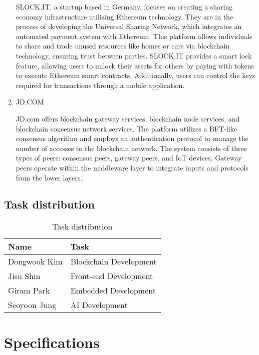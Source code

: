 \documentclass[conference]{IEEEtran}
\begin{document}
\begin{enumerate}[itemsep=2ex, parsep=1ex]
	      SLOCK.IT, a startup based in Germany, focuses on creating a sharing
	      economy infrastructure utilizing Ethereum technology. They are in the process
	      of developing the Universal Sharing Network, which integrates an automated
	      payment system with Ethereum. This platform allows individuals to share and
	      trade unused resources like homes or cars via blockchain technology,
	      ensuring trust between parties. SLOCK.IT provides a smart lock feature,
	      allowing users to unlock their assets for others by paying with tokens to
	      execute Ethereum smart contracts. Additionally, users can control the keys
	      required for transactions through a mobile application.
	      	      	      
	\item JD.COM
	      	      	      
	      JD.com offers blockchain gateway services, blockchain node services, and
	      blockchain consensus network services. The platform utilizes a BFT-like consensus
	      algorithm and employs an authentication protocol to manage the number of accesses
	      to the blockchain network. The system consists of three types of peers: consensus
	      peers, gateway peers, and IoT devices. Gateway peers operate within the
	      middleware layer to integrate inputs and protocols from the lower layers.
\end{enumerate}

\subsection{Task distribution }

\begin{table}[h!]
	\caption{Task distribution}
	\def\arraystretch{1.4} \small
	\begin{tabular}{|p{3cm}|p{4.6cm}|}
		\hline
		Name         & Task                   \\
		\hline
		Dongwook Kim & Blockchain Development \\
		\hline
		Jisu Shin    & Front-end Development  \\
		\hline
		Giram Park   & Embedded Development   \\
		\hline
		Seoyoon Jung & AI Development         \\
		\hline
	\end{tabular}
\end{table}

\section{Specifications}
\end{document}
